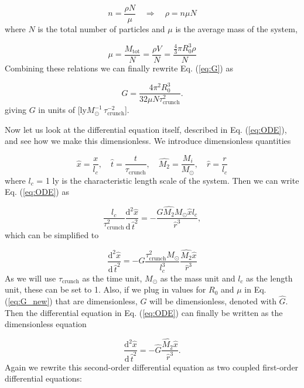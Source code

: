 \documentclass{article}
\begin{document}
\begin{multicols}{2}
\begin{equation*}
	n = \frac{\rho N}{\mu} \quad \Rightarrow \quad \rho = n \mu N
\end{equation*}
where $N$ is the total number of particles and $\mu$ is the average mass of the system,

\begin{equation*}
	\mu = \frac{M_{\mathrm{tot}}}{N} = \frac{\rho V}{N} = \frac{\frac{4}{3} \pi R_0^3 \rho}{N}
\end{equation*}
Combining these relations we can finally rewrite Eq. (\ref{eq:G}) as 

\begin{equation}\label{eq:G_new}
	G = \frac{4 \pi^2 R_0^3}{32 \mu N \tau_{\mathrm{crunch}}^2}.
\end{equation}
giving $G$ in units of [ly$M_{\odot}^{-1} \, \tau_{\mathrm{crunch}}^{-2}$].

Now let us look at the differential equation itself, described in Eq. (\ref{eq:ODE}), and see how we make this dimensionless. We introduce dimensionless quantities

\begin{equation*}
	\hat{x} = \frac{x}{l_c}, \quad \hat{t} = \frac{t}{\tau_{\mathrm{crunch}}}, \quad \hat{M_2} = \frac{M_i}{M_{\odot}}, \quad \hat{r} = \frac{r}{l_c}
\end{equation*} 
where $l_c$ = 1 ly is the characteristic length scale of the system. Then we can write Eq. (\ref{eq:ODE}) as

\begin{equation*}
	\frac{l_c}{\tau_{\mathrm{crunch}}^2} \frac{\mathrm{d}^2 \hat{x}}{\mathrm{d} \, \hat{t}^2} = - \frac{G \hat{M_2} M_{\odot} \hat{x} l_c}{\hat{r}^3},
\end{equation*}
which can be simplified to

\begin{equation*}
	\frac{\mathrm{d}^2 \hat{x}}{\mathrm{d} \, \hat{t}^2} = - G \frac{\tau_{\mathrm{crunch}}^2 M_{\odot}}{l_c^3}  \frac{\hat{M_2} \hat{x}}{\hat{r}^3}
\end{equation*}
As we will use $\tau_{\mathrm{crunch}}$ as the time unit, $M_{\odot}$ as the mass unit and $l_c$ as the length unit, these can be set to 1. Also, if we plug in values for $R_0$ and $\mu$ in Eq. (\ref{eq:G_new}) that are dimensionless, $G$ will be dimensionless, denoted with $\hat{G}$. Then the differential equation in Eq. (\ref{eq:ODE}) can finally be written as the dimensionless equation

\begin{equation}\label{eq:ODE_new}
	\frac{\mathrm{d}^2 \hat{x}}{\mathrm{d} \, \hat{t}^2} = - \hat{G} \frac{\hat{M_2} \hat{x}}{\hat{r}^3}.
\end{equation}
Again we rewrite this second-order differential equation as two coupled first-order differential equations:




\end{multicols}
\end{document}
